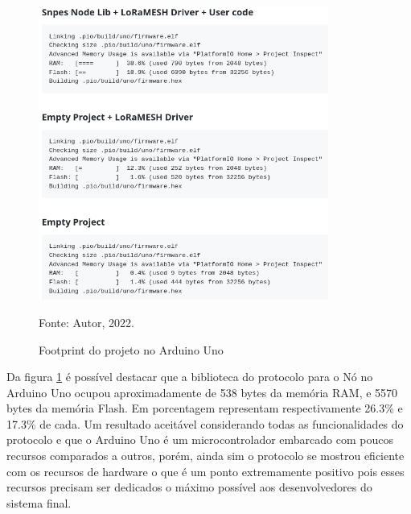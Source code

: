 \begin{figure}[H]
    \centering
	\caption{Footprint do projeto no Arduino Uno}
    \includegraphics[width=0.85\textwidth,keepaspectratio]{img/foot-ard.png}
    \label{fig:foot-ard}
    
    Fonte: Autor, 2022.
\end{figure}

Da figura \ref{fig:foot-ard} é possível destacar que a biblioteca do protocolo
para o Nó no Arduino Uno ocupou aproximadamente de 538 bytes da memória RAM, e
5570 bytes da memória Flash. Em porcentagem representam respectivamente 26.3\%
e 17.3\% de cada. Um resultado aceitável considerando todas as funcionalidades
do protocolo e que o Arduino Uno é um
microcontrolador embarcado com poucos recursos comparados a outros, porém,
ainda sim o protocolo se mostrou eficiente com os recursos de hardware o que
é um ponto extremamente positivo pois esses recursos precisam ser dedicados
o máximo possível aos desenvolvedores do sistema final.

\newpage


